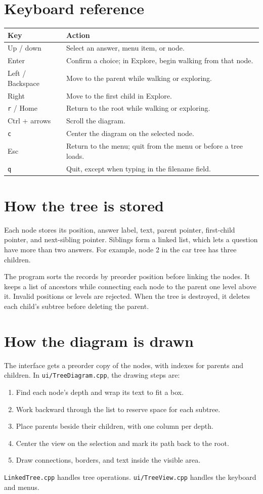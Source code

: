 \documentclass[11pt,letterpaper]{article}
\begin{document}
\section*{Keyboard reference}
\begin{tabular}{@{}p{1.45in}p{4.95in}@{}}
\toprule
\textbf{Key} & \textbf{Action}\\
\midrule
Up / down & Select an answer, menu item, or node.\\[5pt]
Enter & Confirm a choice; in Explore, begin walking from that node.\\[5pt]
Left / Backspace & Move to the parent while walking or exploring.\\[5pt]
Right & Move to the first child in Explore.\\[5pt]
\texttt{r} / Home & Return to the root while walking or exploring.\\[5pt]
Ctrl + arrows & Scroll the diagram.\\[5pt]
\texttt{c} & Center the diagram on the selected node.\\[5pt]
Esc & Return to the menu; quit from the menu or before a tree loads.\\[5pt]
\texttt{q} & Quit, except when typing in the filename field.\\
\bottomrule
\end{tabular}

\newpage
\section*{How the tree is stored}
Each node stores its position, answer label, text, parent pointer, first-child pointer, and next-sibling pointer. Siblings form a linked list, which lets a question have more than two answers. For example, node 2 in the car tree has three children.

The program sorts the records by preorder position before linking the nodes. It keeps a list of ancestors while connecting each node to the parent one level above it. Invalid positions or levels are rejected. When the tree is destroyed, it deletes each child's subtree before deleting the parent.

\section*{How the diagram is drawn}
The interface gets a preorder copy of the nodes, with indexes for parents and children. In \texttt{ui/TreeDiagram.cpp}, the drawing steps are:
\begin{enumerate}
\item Find each node's depth and wrap its text to fit a box.
\item Work backward through the list to reserve space for each subtree.
\item Place parents beside their children, with one column per depth.
\item Center the view on the selection and mark its path back to the root.
\item Draw connections, borders, and text inside the visible area.
\end{enumerate}
\texttt{LinkedTree.cpp} handles tree operations. \texttt{ui/TreeView.cpp} handles the keyboard and menus.
\end{document}
